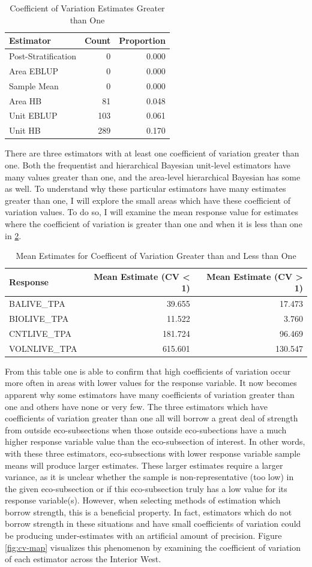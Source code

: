 \documentclass[12pt,twoside]{reedthesis}
\begin{document}
\begin{longtable}[t]{lrr}
\caption{\label{tab:over-one}Coefficient of Variation Estimates Greater than One}\\
\toprule
Estimator & Count & Proportion\\
\midrule
Post-Stratification & 0 & 0.000\\
Area EBLUP & 0 & 0.000\\
Sample Mean & 0 & 0.000\\
Area HB & 81 & 0.048\\
Unit EBLUP & 103 & 0.061\\
\addlinespace
Unit HB & 289 & 0.170\\
\bottomrule
\end{longtable}
There are three estimators with at least one coefficient of variation greater than one. Both the frequentist and hierarchical Bayesian unit-level estimators have many values greater than one, and the area-level hierarchical Bayesian has some as well. To understand why these particular estimators have many estimates greater than one, I will explore the small areas which have these coefficient of variation values. To do so, I will examine the mean response value for estimates where the coefficient of variation is greater than one and when it is less than one in \ref{tab:covg1l1}.
\clearpage
\begin{longtable}[t]{lrr}
\caption{\label{tab:covg1l1}Mean Estimates for Coefficent of Variation Greater than and Less than One}\\
\toprule
Response & Mean Estimate (CV < 1) & Mean Estimate (CV > 1)\\
\midrule
BALIVE\_TPA & 39.655 & 17.473\\
BIOLIVE\_TPA & 11.522 & 3.760\\
CNTLIVE\_TPA & 181.724 & 96.469\\
VOLNLIVE\_TPA & 615.601 & 130.547\\
\bottomrule
\end{longtable}
From this table one is able to confirm that high coefficients of variation occur more often in areas with lower values for the response variable. It now becomes apparent why some estimators have many coefficients of variation greater than one and others have none or very few. The three estimators which have coefficients of variation greater than one all will borrow a great deal of strength from outside eco-subsections when those outside eco-subections have a much higher response variable value than the eco-subsection of interest. In other words, with these three estimators, eco-subsections with lower response variable sample means will produce larger estimates. These larger estimates require a larger variance, as it is unclear whether the sample is non-representative (too low) in the given eco-subsection or if this eco-subsection truly has a low value for its response variable(s). However, when selecting methods of estimation which borrow strength, this is a beneficial property. In fact, estimators which do not borrow strength in these situations and have small coefficients of variation could be producing under-estimates with an artificial amount of precision. Figure \ref{fig:cv-map} visualizes this phenomenon by examining the coefficient of variation of each estimator across the Interior West.
\end{document}
